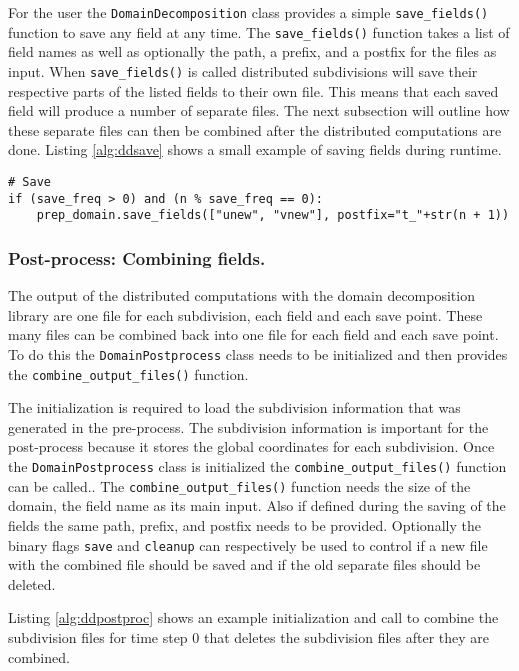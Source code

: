 For the user the \texttt{DomainDecomposition} class provides a simple \texttt{save\_fields()} function to save any field at any time.
The \texttt{save\_fields()} function takes a list of field names as well as optionally the path, a prefix, and a postfix for the files as input.
When \texttt{save\_fields()} is called distributed subdivisions will save their respective parts of the listed fields to their own file.
This means that each saved field will produce a number of separate files.
The next subsection will outline how these separate files can then be combined after the distributed computations are done.
Listing \ref{alg:ddsave} shows a small example of saving fields during runtime.

\begin{lstlisting}[caption={Example calling to save two fields during time stepping using the domain decomposition libarary},captionpos=b, label={alg:ddsave}]
# Save
if (save_freq > 0) and (n % save_freq == 0):
    prep_domain.save_fields(["unew", "vnew"], postfix="t_"+str(n + 1))
\end{lstlisting}

\subsubsection{Post-process: Combining fields.}
The output of the distributed computations with the domain decomposition library are one file for each subdivision, each field and each save point.
These many files can be combined back into one file for each field and each save point.
To do this the \texttt{DomainPostprocess} class needs to be initialized and then provides the \texttt{combine\_output\_files()} function.

The initialization is required to load the subdivision information that was generated in the pre-process.
The subdivision information is important for the post-process because it stores the global coordinates for each subdivision.
Once the \texttt{DomainPostprocess} class is initialized the \texttt{combine\_output\_files()} function can be called..
The \texttt{combine\_output\_files()} function needs the size of the domain, the field name as its main input.
Also if defined during the saving of the fields the same path, prefix, and postfix needs to be provided.
Optionally the binary flags \texttt{save} and \texttt{cleanup} can respectively be used to control if a new file with the combined file should be saved and if the old separate files should be deleted.

Listing \ref{alg:ddpostproc} shows an example initialization and call to combine the subdivision files for time step 0 that deletes the subdivision files after they are combined.

